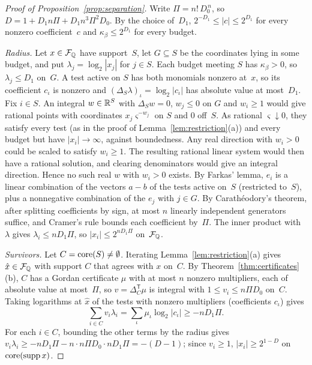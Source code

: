 \begin{proof}[Proof of Proposition~\ref{prop:separation}]
Write $\Pi=n!\,D_0^{\,n}$, so $D=1+D_1n\Pi+D_1n^3\Pi^2D_0$. By the choice
of~$D_1$, $2^{-D_1}\le|c|\le2^{D_1}$ for every nonzero coefficient~$c$ and
$\kappa_\beta\le2^{D_1}$ for every budget.

\emph{Radius.} Let $x\in\mathcal F_{\mathbb{Q}}$ have support~$S$, let $G\subseteq S$ be the
coordinates lying in some budget, and put $\lambda_j=\log_2|x_j|$
for $j\in S$. Each budget meeting $S$ has $\kappa_\beta>0$, so
$\lambda_j\le D_1$ on~$G$. A test active on $S$ has both monomials nonzero
at~$x$, so its coefficient $c_\iota$ is nonzero and
$(\Delta_S\lambda)_\iota=\log_2|c_\iota|$ has absolute value at
most~$D_1$. Fix $i\in S$. An integral $w\in\mathbb{R}^S$ with $\Delta_Sw=0$,
$w_j\le0$ on $G$ and $w_i\ge1$ would give rational points with coordinates
$x_j\varsigma^{-w_j}$ on $S$ and $0$ off~$S$. As rational
$\varsigma\downarrow0$, they satisfy every test (as in the proof of
Lemma~\ref{lem:restriction}(a)) and every budget but have $|x_i|\to\infty$,
against boundedness. %
Any real direction with $w_i>0$ could be scaled to satisfy $w_i\ge1$. The
resulting rational linear system would then have a rational solution, and
clearing denominators would give an integral direction. Hence no such real
$w$ with $w_i>0$ exists. By Farkas' lemma, $e_i$ is a linear combination of
the vectors $a-b$ of the tests active on~$S$ (restricted to~$S$), plus a
nonnegative combination of the $e_j$ with $j\in G$.
By Carath\'eodory's theorem, after splitting coefficients by sign, at
most $n$ linearly independent generators suffice, and Cramer's rule bounds
each coefficient by~$\Pi$. The inner product with $\lambda$ gives
$\lambda_i\le nD_1\Pi$, so $|x_i|\le2^{nD_1\Pi}$ on~$\mathcal F_{\mathbb{Q}}$.

\emph{Survivors.} Let $C=\operatorname{core}(S)\neq\emptyset$. Iterating
Lemma~\ref{lem:restriction}(a) gives $\hat x\in\mathcal F_{\mathbb{Q}}$ with support $C$ that
agrees with $x$ on~$C$. By Theorem~\ref{thm:certificates}(b), $C$ has a
Gordan certificate $\mu$ with at most $n$ nonzero multipliers, each of
absolute value at most~$\Pi$, so $v=\Delta_C^{\mathsf T}\mu$ is integral
with $1\le v_i\le n\Pi D_0$ on~$C$. Taking logarithms at $\hat x$ of the
tests with nonzero multipliers (coefficients $c_\iota$) gives
\[
  \sum_{i\in C}v_i\lambda_i=\sum_\iota\mu_\iota\log_2|c_\iota|\ge-nD_1\Pi .
\]
For each $i\in C$, bounding the other terms by the radius gives
$v_i\lambda_i\ge-nD_1\Pi-n\cdot n\Pi D_0\cdot nD_1\Pi=-(D-1)$; since
$v_i\ge1$, $|x_i|\ge2^{1-D}$ on $\operatorname{core}(\operatorname{supp} x)$.


\end{proof}
